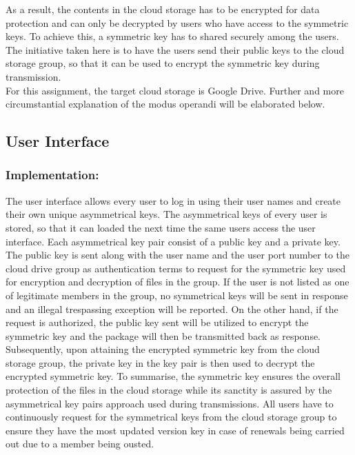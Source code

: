 \documentclass[12pt]{article}
\begin{document}
As a result, the contents in the cloud storage has to be encrypted for data protection and can only be decrypted by users who have access to the symmetric keys. To achieve this, a symmetric key has to shared securely among the users. The initiative taken here is to have the users send their public keys to the cloud storage group, so that it can be used to encrypt the symmetric key during transmission. \\

For this assignment, the target cloud storage is Google Drive. Further and more circumstantial explanation of the modus operandi will be elaborated below.
\newpage
\subsection*{User Interface}
\subsubsection*{Implementation:}
The user interface allows every user to log in using their user names and create their own unique asymmetrical keys. The asymmetrical keys of every user is stored, so that it can loaded the next time the same users access the user interface. Each asymmetrical key pair consist of a public key and a private key. The public key is sent along with the user name and the user port number to the cloud drive group as authentication terms to request for the symmetric key used for encryption and decryption of files in the group. If the user is not listed as one of legitimate members in the group, no symmetrical keys will be sent in response and an illegal trespassing exception will be reported. On the other hand, if the request is authorized, the public key sent will be utilized to encrypt the symmetric key and the package will then be transmitted back as response. \\

Subsequently, upon attaining the encrypted symmetric key from the cloud storage group, the private key in the key pair is then used to decrypt the encrypted symmetric key. To summarise, the symmetric key ensures the overall protection of the files in the cloud storage while its sanctity is assured by the asymmetrical key pairs approach used during transmissions. All users have to continuously request for the symmetrical keys from the cloud storage group to ensure they have the most updated version key in case of renewals being carried out due to a member being ousted.\\
\end{document}
